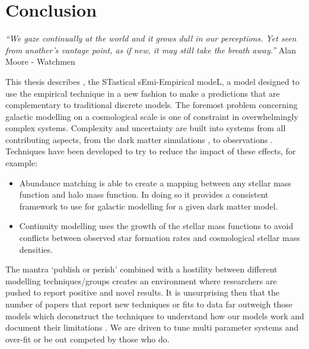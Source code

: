 
\chapter{Conclusion} %
\label{Chapter:Conclusion}
\begin{center}
    \textit{``We gaze continually at the world and it grows dull in our perceptions. Yet seen from another's vantage point, as if new, it may still take the breath away.''}
    Alan Moore - Watchmen
\end{center}


This thesis describes \steel, the STastical sEmi-Empirical modeL, a model designed to use the empirical technique in a new fashion to make a predictions that are complementary to traditional discrete models. The foremost problem concerning galactic modelling on a cosmological scale is one of constraint in overwhelmingly complex systems. Complexity and uncertainty are built into systems from all contributing aspects, from the dark matter simulations \cite[e.g.]{vandenBosch2018DisruptionFiction}, to observations \cite[e.g.]{Bernardi2017ComparingLight, Lapi2017StellarEquation, Leja2019AnSurvey}. Techniques have been developed to try to reduce the impact of these effects, for example:
\begin{itemize}
    \item Abundance matching is able to create a mapping between any stellar mass function and halo mass function. In doing so it provides a consistent framework to use for galactic modelling for a given dark matter model.
    \item Continuity modelling uses the growth of the stellar mass functions to avoid conflicts between observed star formation rates and cosmological stellar mass densities. 
\end{itemize}

The mantra `publish or perish' combined with a hostility between different modelling techniques/groups creates an environment where researchers are pushed to report positive and novel results. It is unsurprising then that the number of papers that report new techniques or fits to data far outweigh those models which deconstruct the techniques to understand how our models work and document their limitations \cite[e.g.][]{vandenBosch2017DissectingSimulation, vandenBosch2018DisruptionFiction, Asquith2018CosmicModels}. We are driven to tune multi parameter systems and over-fit or be out competed by those who do.

